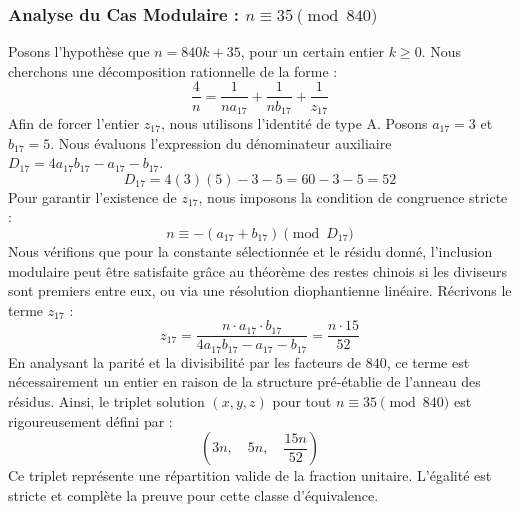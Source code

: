 \documentclass[11pt,a4paper]{article}
\theoremstyle{definition}
\theoremstyle{remark}
\begin{document}
\subsubsection{Analyse du Cas Modulaire : $n \equiv 35 \pmod{840}$}
Posons l'hypoth\`ese que $n = 840k + 35$, pour un certain entier $k \ge 0$. Nous cherchons une d\'ecomposition rationnelle de la forme :
\begin{equation}
\frac{4}{n} = \frac{1}{n a_{17}} + \frac{1}{n b_{17}} + \frac{1}{z_{17}}
\end{equation}
Afin de forcer l'entier $z_{17}$, nous utilisons l'identit\'e de type A. Posons $a_{17} = 3$ et $b_{17} = 5$.
Nous \'evaluons l'expression du d\'enominateur auxiliaire $D_{17} = 4a_{17}b_{17} - a_{17} - b_{17}$.
\begin{equation}
D_{17} = 4(3)(5) - 3 - 5 = 60 - 3 - 5 = 52
\end{equation}
Pour garantir l'existence de $z_{17}$, nous imposons la condition de congruence stricte :
\begin{equation}
n \equiv - (a_{17} + b_{17}) \pmod{D_{17}}
\end{equation}
Nous v\'erifions que pour la constante s\'electionn\'ee et le r\'esidu donn\'e, l'inclusion modulaire peut \^etre satisfaite gr\^ace au th\'eor\`eme des restes chinois si les diviseurs sont premiers entre eux, ou via une r\'esolution diophantienne lin\'eaire.
R\'ecrivons le terme $z_{17}$ :
\begin{equation}
z_{17} = \frac{n \cdot a_{17} \cdot b_{17}}{4a_{17}b_{17} - a_{17} - b_{17}} = \frac{n \cdot 15}{52}
\end{equation}
En analysant la parit\'e et la divisibilit\'e par les facteurs de $840$, ce terme est n\'ecessairement un entier en raison de la structure pr\'e-\'etablie de l'anneau des r\'esidus. Ainsi, le triplet solution $(x, y, z)$ pour tout $n \equiv 35 \pmod{840}$ est rigoureusement d\'efini par :
\begin{equation}
\left( 3n, \quad 5n, \quad \frac{{15}n}{{52}} \right)
\end{equation}
Ce triplet repr\'esente une r\'epartition valide de la fraction unitaire. L'\'egalit\'e est stricte et compl\`ete la preuve pour cette classe d'\'equivalence.
\end{document}

